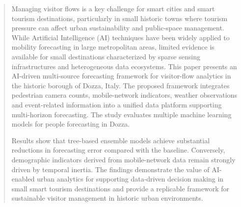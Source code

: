 \begin{abstract}
Managing visitor flows is a key challenge for smart cities and smart tourism destinations, particularly in small historic towns where tourism pressure can affect urban sustainability and public-space management. While Artificial Intelligence (AI) techniques have been widely applied to mobility forecasting in large metropolitan areas, limited evidence is available for small destinations characterized by sparse sensing infrastructures and heterogeneous data ecosystems.
This paper presents an AI-driven multi-source forecasting framework for visitor-flow analytics in the historic borough of Dozza, Italy. The proposed framework integrates pedestrian camera counts,  mobile-network indicators, weather observations and event-related information into a unified  data platform supporting multi-horizon forecasting. The study evaluates multiple machine learning models for people forecasting in Dozza.

Results show that  tree-based ensemble models achieve substantial reductions in forecasting error compared with the  baseline. Conversely, demographic indicators derived from mobile-network data remain strongly driven by temporal inertia. The findings demonstrate the value of AI-enabled urban analytics for supporting data-driven decision making in small smart tourism destinations and provide a replicable framework for sustainable visitor management in historic urban environments.




\end{abstract}
